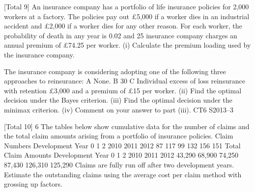 [Total 9]
An insurance company has a portfolio of life insurance policies for 2,000 workers at a
factory. The policies pay out £5,000 if a worker dies in an industrial accident and
£2,000 if a worker dies for any other reason. For each worker, the probability of
death in any year is 0.02 and 25%
insurance company charges an annual premium of £74.25 per worker.
(i)
Calculate the premium loading used by the insurance company.

The insurance company is considering adopting one of the following three approaches
to reinsurance:
A None.
B 30%
C Individual excess of loss reinsurance with retention £3,000 and a
premium of £15 per worker.
(ii) Find the optimal decision under the Bayes criterion. 
(iii) Find the optimal decision under the minimax criterion. 
(iv) Comment on your answer to part (iii).
CT6 S2013–3

[Total 10]
6
The tables below show cumulative data for the number of claims and the total claim
amounts arising from a portfolio of insurance policies.
Claim Numbers
Development Year
0
1
2
2010
2011
2012
87
117
99
132
156
151
Total Claim Amounts
Development Year
0
1
2
2010
2011
2012
43,290
68,900
74,250
87,430 126,310
125,290
Claims are fully run off after two development years.
Estimate the outstanding claims using the average cost per claim method with
grossing up factors.




